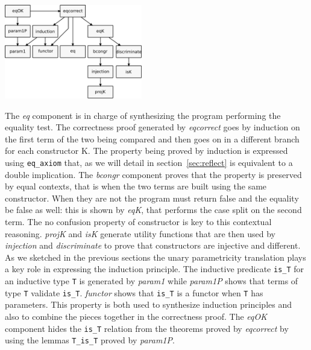 \documentclass[a4paper,UKenglish,cleveref, autoref]{lipics-v2019}
\newcommand{\derive}[1]{\emph{#1}}
\begin{document}
\begin{center}
\includegraphics[width=0.45\textwidth]{derive.pdf}
\end{center}

The \derive{eq} component is in charge of synthesizing the program
performing the equality test.
The correctness proof generated by \derive{eqcorrect} goes by induction on
the first term of the two being compared and then goes on
in a different branch for each constructor K. 
The property being proved by induction is expressed
using \lstinline+eq_axiom+ that, as we will detail in
section~\ref{sec:reflect} is equivalent to a double implication.
The \derive{bcongr} component proves that the property is preserved
by equal contexts, that is when the two terms are built using the
same constructor. When they are not the program must return false
and the equality be false as well: this is shown by \derive{eqK},
that performs the case split on the second term. The no confusion
property of constructor is key to this contextual reasoning.
\derive{projK} and \derive{isK} generate utility functions that
are then used by \derive{injection} and \derive{discriminate} to
prove that constructors are injective and different.
As we sketched in the previous sections the unary parametricity
translation plays a key role in expressing the induction
principle. The inductive predicate \lstinline+is_T+ for an inductive
type \lstinline+T+ is generated by \derive{param1} while
\derive{param1P} shows that terms of type \lstinline+T+ validate
\lstinline+is_T+. \derive{functor} shows that \lstinline+is_T+ is a
functor when \lstinline+T+ has parameters. This property is both
used to synthesize induction principles and also to combine the
pieces together in the correctness proof.
The \derive{eqOK} component hides the \lstinline+is_T+ relation
from the theorems proved by \derive{eqcorrect} by using the lemmas
\lstinline+T_is_T+ proved by \derive{param1P}.
\end{document}
